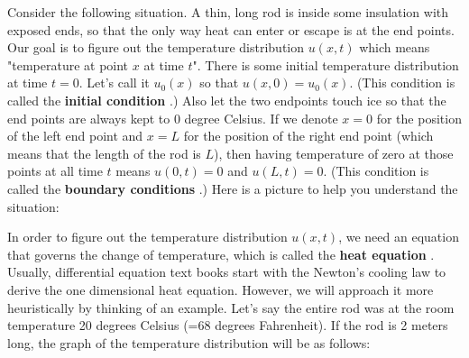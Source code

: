 \documentclass[12pt]{report}
\begin{document}
Consider the following situation. A thin, long rod is inside some insulation with exposed ends, so that the only way heat can enter or escape is at the end points. Our goal is to figure out the temperature distribution $u(x,t)$ which means "temperature at point $x$ at time $t$". There is some initial temperature distribution at time $t=0$. Let's call it $u_0(x)$ so that $u(x,0)=u_0(x)$. (This condition is called the \textbf{initial condition }.) 
Also let the two endpoints touch ice so that the end points are always kept to 0 degree Celsius. If we denote $x=0$ for the position of the left end point and $x=L$ for the position of the right end point (which means that the length of the rod is $L$), then having temperature of zero at those points at all time $t$ means $u(0,t)=0$ and $u(L,t)=0$. (This condition is called the \textbf{boundary conditions }.) Here is a picture to help you understand the situation:
\begin{center}  \end{center}
In order to figure out the temperature distribution $u(x,t)$, we need an equation that governs the change of temperature, which is called the \textbf{heat equation }. Usually, differential equation text books start with the Newton's cooling law to derive the one dimensional heat equation. However, we will approach it more heuristically by thinking of an example.
Let's say the entire rod was at the room temperature 20 degrees Celsius (=68 degrees Fahrenheit). If the rod is 2 meters long, the graph of the temperature distribution will be as follows:
\begin{center}  \end{center}
\end{document}
